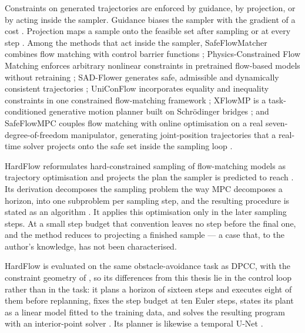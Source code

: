 \documentclass[headsepline,footsepline,footinclude=false,oneside,fontsize=11pt,paper=a4,listof=totoc,bibliography=totoc]{scrbook}
\theoremstyle{definition}
\theoremstyle{plain}
\theoremstyle{remark}
\begin{document}
Constraints on generated trajectories are enforced by guidance, by projection, or by acting inside the
sampler. Guidance biases the sampler with the gradient of a cost \parencite{carvalho2025motion}.
Projection maps a sample onto the feasible set after sampling \parencite{power2023sampling} or at every
step \parencite{christopher2024constrained,romer2025diffusion}. Among the methods that act inside the
sampler, SafeFlowMatcher combines flow matching with control barrier functions
\parencite{yang2025safeflowmatcher}; Physics-Constrained Flow Matching enforces arbitrary nonlinear
constraints in pretrained flow-based models without retraining \parencite{utkarsh2025pcfm}; SAD-Flower
generates safe, admissible and dynamically consistent trajectories \parencite{huang2025sadflower};
UniConFlow incorporates equality and inequality constraints in one constrained flow-matching framework
\parencite{yang2025uniconflow}; XFlowMP is a task-conditioned generative motion planner built on
Schr\"odinger bridges \parencite{nguyen2025xflowmp}; and SafeFlowMPC couples flow matching with online
optimisation on a real seven-degree-of-freedom manipulator, generating joint-position trajectories
that a real-time solver projects onto the safe set inside the sampling loop
\parencite[Sec.~III]{oelerich2026safeflowmpc}.

HardFlow reformulates hard-constrained sampling of flow-matching models as trajectory optimisation and
projects the plan the sampler is predicted to reach \parencite{li2025hardflow}. Its derivation
decomposes the sampling problem the way \ac{MPC} decomposes a horizon, into one subproblem per
sampling step, and the resulting procedure is stated as an algorithm
\parencite[Alg.~1]{li2025hardflow}. It applies this optimisation only in the later sampling steps. At
a small step budget that convention leaves no step before the final one, and the method reduces to
projecting a finished sample --- a case that, to the author's knowledge, has not been characterised.

HardFlow is evaluated on the same obstacle-avoidance task as \ac{DPCC}, with the constraint geometry
of \parencite{romer2025diffusion}, so its differences from this thesis lie in the control loop rather
than in the task: it plans a horizon of sixteen steps and executes eight of them before replanning,
fixes the step budget at ten Euler steps, states its plant as a linear model fitted to the training
data, and solves the resulting program with an interior-point solver
\parencite[App.~C]{li2025hardflow}. Its planner is likewise a temporal U-Net
\parencite{janner2022planning}.
\end{document}
